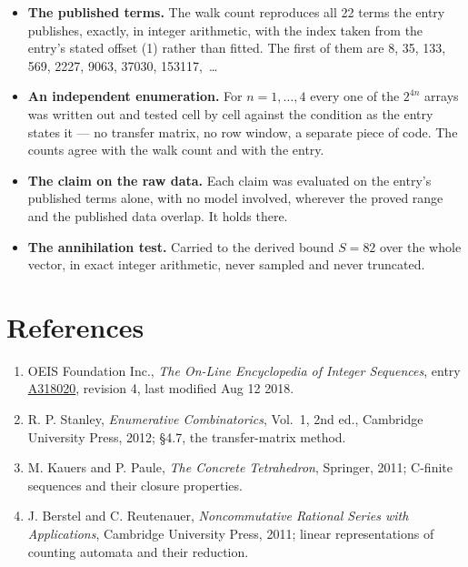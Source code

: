 \documentclass[11pt]{article}
\theoremstyle{definition}
\begin{document}
\begin{itemize}

\item {\bfseries The published terms.} The walk count reproduces all 22 terms the entry publishes, exactly, in integer arithmetic, with the index taken from the entry's stated offset (1) rather than fitted. The first of them are 8, 35, 133, 569, 2227, 9063, 37030, 153117,~\dots

\item {\bfseries An independent enumeration.} For $n = 1,\dots,4$ every one of the $2^{4n}$ arrays was written out and tested cell by cell against the condition as the entry states it --- no transfer matrix, no row window, a separate piece of code. The counts agree with the walk count and with the entry.

\item {\bfseries The claim on the raw data.} Each claim was evaluated on the entry's published terms alone, with no model involved, wherever the proved range and the published data overlap. It holds there.

\item {\bfseries The annihilation test.} Carried to the derived bound $S = 82$ over the whole vector, in exact integer arithmetic, never sampled and never truncated.

\end{itemize}

\section{References}

\begin{enumerate}

\item OEIS Foundation Inc., \emph{The On-Line Encyclopedia of Integer Sequences}, entry \href{https://oeis.org/A318020}{A318020}, revision 4, last modified Aug 12 2018.

\item R. P. Stanley, \emph{Enumerative Combinatorics}, Vol.~1, 2nd ed., Cambridge University Press, 2012; \S4.7, the transfer-matrix method.

\item M. Kauers and P. Paule, \emph{The Concrete Tetrahedron}, Springer, 2011; C-finite sequences and their closure properties.

\item J. Berstel and C. Reutenauer, \emph{Noncommutative Rational Series with Applications}, Cambridge University Press, 2011; linear representations of counting automata and their reduction.

\end{enumerate}
\end{document}
